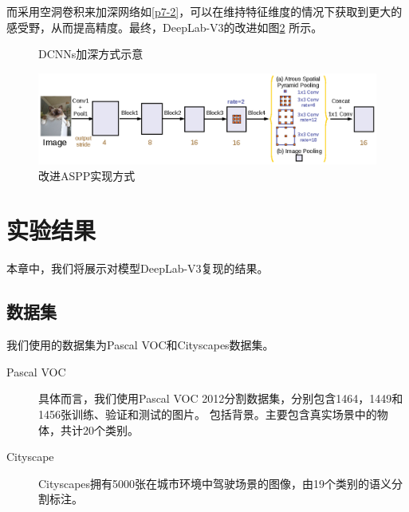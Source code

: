 \documentclass[10pt, a4paper]{article}
\begin{document}
而采用空洞卷积来加深网络如\ref{p7-2}，可以在维持特征维度的情况下获取到更大的感受野，从而提高精度。最终，DeepLab-V3的改进如图\ref{p8}
所示。

\begin{figure}[htbp]
    \centering
    \caption{DCNNs加深方式示意}
    \label{p7}
\end{figure}

\begin{figure}[htbp]
    \centering
    \includegraphics[width=\textwidth]{imgs/p8.eps}
    \caption{改进ASPP实现方式}
    \label{p8}
\end{figure}

\section{实验结果}
本章中，我们将展示对模型DeepLab-V3复现的结果。

\subsection{数据集}
我们使用的数据集为Pascal VOC和Cityscapes数据集。
\begin{description}
    \item[Pascal VOC] 具体而言，我们使用Pascal VOC 2012分割数据集，分别包含1464，1449和1456张训练、验证和测试的图片。
    包括背景。主要包含真实场景中的物体，共计20个类别。
    \item[Cityscape] Cityscapes拥有5000张在城市环境中驾驶场景的图像，由19个类别的语义分割标注。
\end{description}
\end{document}
